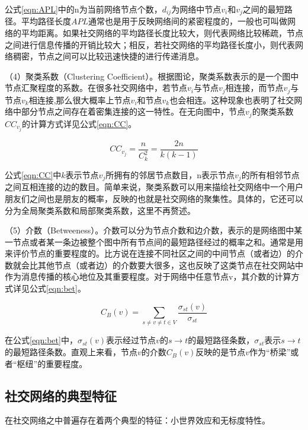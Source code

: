 公式\ref{eqn:APL}中的n为当前网络节点个数，$d_{ij}$为网络中节点$v_i$和$v_j$之间的最短路径。平均路径长度$APL$通常也是用于反映网络间的紧密程度的，一般也可叫做网络的平均距离。如果社交网络的平均路径长度比较大，则代表网络比较稀疏，节点之间进行信息传播的开销比较大；相反，若社交网络的平均路径长度小，则代表网络稠密，节点之间可以比较迅速快捷的进行传递消息。

（4）聚类系数（Clustering Coefficient）。根据图论，聚类系数表示的是一个图中节点汇聚程度的系数。在很多社交网络中，若节点$v_i$与节点$v_j$相连接，而节点$v_j$与节点$v_k$相连接,那么很大概率上节点$v_i$和节点$v_k$也会相连。这种现象也表明了社交网络中部分节点之间存在着密集连接的这一特性。在无向图中，节点$v_j$的聚类系数$CC_{v_j}$的计算方式详见公式\ref{eqn:CC}。

\begin{equation}
  \label{eqn:CC}
  CC_{v_j}=\frac{n}{C_k^2}=\frac{2n}{k(k-1)}
\end{equation}

公式\ref{eqn:CC}中$k$表示节点$v_j$所拥有的邻居节点数目，n表示节点$v_j$的所有相邻节点之间互相连接的边的数目。简单来说，聚类系数可以用来描绘社交网络中一个用户朋友们之间也是朋友的概率，反映的也就是社交网络的聚集性。具体的，它还可以分为全局聚类系数和局部聚类系数，这里不再赘述。

（5）介数（Betweeness）。介数可以分为节点介数和边介数，表示的是网络图中某一节点或者某一条边被整个图中所有节点间的最短路径经过的概率之和。通常是用来评价节点的重要程度的。比方说在连接不同社区之间的中间节点（或者边）的介数就会比其他节点（或者边）的介数要大很多，这也反映了这类节点在社交网站中作为消息传播的核心地位及其重要程度。对于网络中任意节点v，其介数的计算方式详见公式\ref{eqn:bet}。

\begin{equation}
  \label{eqn:bet}
  C_B(v)=\sum _{s\neq v\neq t \in V}\frac{\sigma_{st}(v)}{\sigma_{st}}
\end{equation}

在公式\ref{eqn:bet}中，$\sigma_{st}(v)$表示经过节点$v$的$s\rightarrow t$的最短路径条数，$\sigma_{st}$表示$s\rightarrow t$的最短路径条数。直观上来看，节点$v$的介数$C_B(v)$反映的是节点$v$作为“桥梁”或者“枢纽”的重要程度。

\subsection{社交网络的典型特征}
在社交网络之中普遍存在着两个典型的特征：小世界效应和无标度特性。

